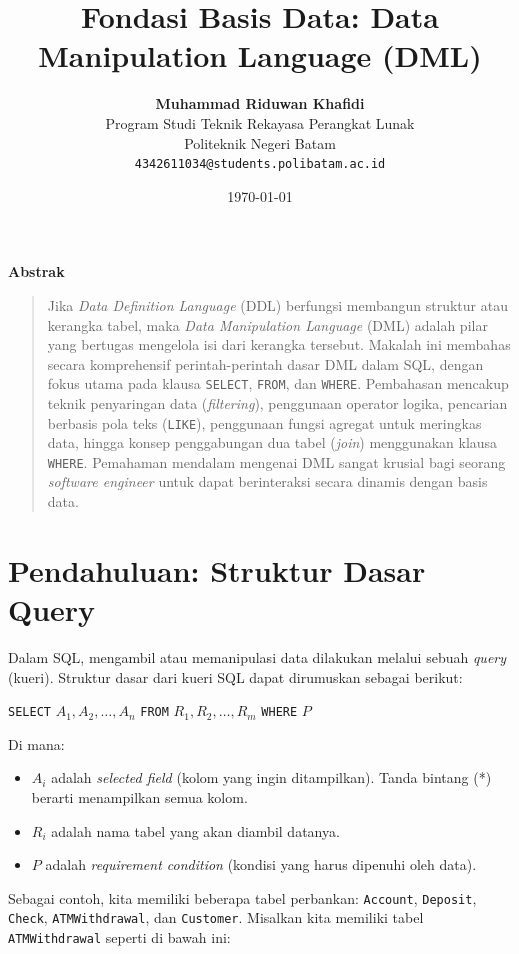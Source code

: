 \documentclass[11pt,a4paper]{article}
\title{\vspace{-1.5cm}\textbf{\sffamily\LARGE Fondasi Basis Data: Data Manipulation Language (DML)}}
\author{
	\textbf{Muhammad Riduwan Khafidi} \\
	\small Program Studi Teknik Rekayasa Perangkat Lunak \\
	\small Politeknik Negeri Batam \\
	\small \texttt{4342611034@students.polibatam.ac.id}
}
\date{\small\today}
\renewenvironment{abstract}
{\small
	\begin{center}\textbf{\sffamily Abstrak}\end{center}
	\begin{quote}}
	{\end{quote}}
\begin{document}
\maketitle
\thispagestyle{empty}

\begin{abstract}
	Jika \textit{Data Definition Language} (DDL) berfungsi membangun struktur atau kerangka tabel, maka \textit{Data Manipulation Language} (DML) adalah pilar yang bertugas mengelola isi dari kerangka tersebut. Makalah ini membahas secara komprehensif perintah-perintah dasar DML dalam SQL, dengan fokus utama pada klausa \texttt{SELECT}, \texttt{FROM}, dan \texttt{WHERE}. Pembahasan mencakup teknik penyaringan data (\textit{filtering}), penggunaan operator logika, pencarian berbasis pola teks (\texttt{LIKE}), penggunaan fungsi agregat untuk meringkas data, hingga konsep penggabungan dua tabel (\textit{join}) menggunakan klausa \texttt{WHERE}. Pemahaman mendalam mengenai DML sangat krusial bagi seorang \textit{software engineer} untuk dapat berinteraksi secara dinamis dengan basis data.
\end{abstract}

\section{Pendahuluan: Struktur Dasar Query}

Dalam SQL, mengambil atau memanipulasi data dilakukan melalui sebuah \textit{query} (kueri). Struktur dasar dari kueri SQL dapat dirumuskan sebagai berikut:

\begin{center}
	\texttt{SELECT} \(A_1, A_2, \dots, A_n\) \texttt{FROM} \(R_1, R_2, \dots, R_m\) \texttt{WHERE} \(P\)
\end{center}

Di mana:
\begin{itemize}
	\item \(A_i\) adalah \textit{selected field} (kolom yang ingin ditampilkan). Tanda bintang (*) berarti menampilkan semua kolom.
	\item \(R_i\) adalah nama tabel yang akan diambil datanya.
	\item \(P\) adalah \textit{requirement condition} (kondisi yang harus dipenuhi oleh data).
\end{itemize}

Sebagai contoh, kita memiliki beberapa tabel perbankan: \texttt{Account}, \texttt{Deposit}, \texttt{Check}, \texttt{ATMWithdrawal}, dan \texttt{Customer}. Misalkan kita memiliki tabel \texttt{ATMWithdrawal} seperti di bawah ini:
\end{document}
